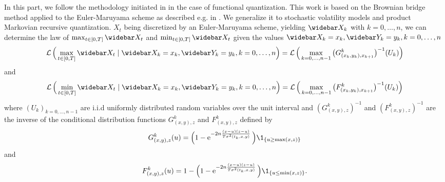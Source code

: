 \medskip
In this part, we follow the methodology initiated in \cite{sagna2010pricing} in the case of functional quantization. This work is based on the Brownian bridge method applied to the Euler-Maruyama scheme as described e.g. in \cite{pages2018numerical}. We generalize it to stochastic volatility models and product Markovian recursive quantization. $X_t$ being discretized by an Euler-Maruyama scheme, yielding $\widebar X_k$ with $k=0, \dots, n$, we can determine the law of $\max_{t \in [0,T]} \widebar X_t$ and $\min_{t \in [0,T]} \widebar X_t$ given the values $\widebar X_k = x_k, \widebar Y_k = y_k, k = 0, \dots, n$
\begin{equation}
	\Law \Big( \max_{t \in [0,T]} \widebar X_t \mid \widebar X_k = x_k, \widebar Y_k = y_k, k = 0, \dots, n \Big) = \Law \Big( \max_{k = 0, \dots, n-1} \big( G_{(x_k,y_k), x_{k+1}}^k \big)^{-1} (U_k) \Big)
\end{equation}
and
\begin{equation}
	\Law \Big( \min_{t \in [0,T]} \widebar X_t \mid \widebar X_k = x_k, \widebar Y_k = y_k, k = 0, \dots, n \Big) = \Law \Big( \max_{k = 0, \dots, n-1} \big( F_{(x_k,y_k), x_{k+1}}^k \big)^{-1} (U_k) \Big)
\end{equation}
where $(U_k)_{k=0,\dots, n-1}$ are i.i.d uniformly distributed random variables over the unit interval and $(G_{(x,y),z}^k)^{-1}$ and $(F_{(x,y),z}^k)^{-1}$ are the inverse of the conditional distribution functions $G_{(x,y),z}^k$ and $F_{(x,y),z}^k$ defined by
\begin{equation}\label{RH:upoutfunction}
	G_{(x,y),z}^k(u) = \Big( 1 - \e^{-2n \frac{(x-u)(z-u)}{T \sigma^2(t_k,x,y)}} \Big) \1_{\{ u \geq \max(x,z) \}}
\end{equation}
and
\begin{equation}\label{RH:downoutfunction}
	F_{(x,y),z}^k(u) = 1 - \Big( 1 - \e^{-2n \frac{(x-u)(z-u)}{T \sigma^2(t_k,x,y)}} \Big) \1_{\{ u \leq \min(x,z) \}}.
\end{equation}

